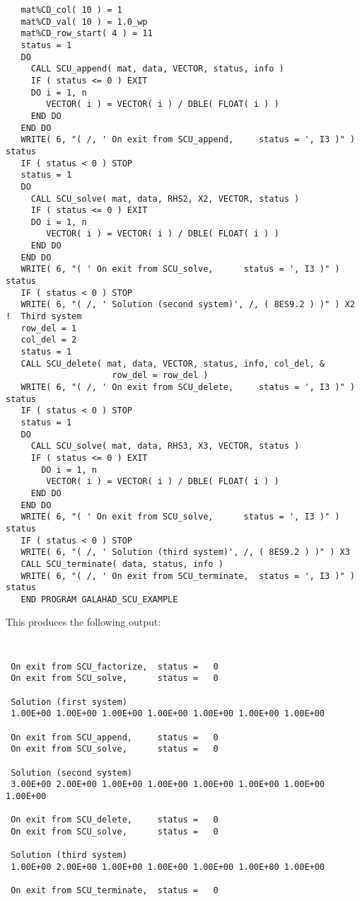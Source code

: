 \documentclass{galahad}
\begin{document}
{\begin{verbatim}
   mat%CD_col( 10 ) = 1 
   mat%CD_val( 10 ) = 1.0_wp 
   mat%CD_row_start( 4 ) = 11 
   status = 1 
   DO 
     CALL SCU_append( mat, data, VECTOR, status, info ) 
     IF ( status <= 0 ) EXIT 
     DO i = 1, n 
        VECTOR( i ) = VECTOR( i ) / DBLE( FLOAT( i ) ) 
     END DO 
   END DO 
   WRITE( 6, "( /, ' On exit from SCU_append,     status = ', I3 )" ) status 
   IF ( status < 0 ) STOP 
   status = 1 
   DO 
     CALL SCU_solve( mat, data, RHS2, X2, VECTOR, status ) 
     IF ( status <= 0 ) EXIT 
     DO i = 1, n 
        VECTOR( i ) = VECTOR( i ) / DBLE( FLOAT( i ) ) 
     END DO 
   END DO 
   WRITE( 6, "( ' On exit from SCU_solve,      status = ', I3 )" ) status 
   IF ( status < 0 ) STOP 
   WRITE( 6, "( /, ' Solution (second system)', /, ( 8ES9.2 ) )" ) X2 
!  Third system 
   row_del = 1 
   col_del = 2 
   status = 1 
   CALL SCU_delete( mat, data, VECTOR, status, info, col_del, & 
                     row_del = row_del ) 
   WRITE( 6, "( /, ' On exit from SCU_delete,     status = ', I3 )" ) status 
   IF ( status < 0 ) STOP 
   status = 1 
   DO 
     CALL SCU_solve( mat, data, RHS3, X3, VECTOR, status ) 
     IF ( status <= 0 ) EXIT 
       DO i = 1, n 
        VECTOR( i ) = VECTOR( i ) / DBLE( FLOAT( i ) ) 
     END DO 
   END DO 
   WRITE( 6, "( ' On exit from SCU_solve,      status = ', I3 )" ) status 
   IF ( status < 0 ) STOP 
   WRITE( 6, "( /, ' Solution (third system)', /, ( 8ES9.2 ) )" ) X3 
   CALL SCU_terminate( data, status, info ) 
   WRITE( 6, "( /, ' On exit from SCU_terminate,  status = ', I3 )" ) status 
   END PROGRAM GALAHAD_SCU_EXAMPLE 
\end{verbatim}
}
This produces the following output:
{\tt
\begin{verbatim}
 On exit from SCU_factorize,  status =   0
 On exit from SCU_solve,      status =   0

 Solution (first system)
 1.00E+00 1.00E+00 1.00E+00 1.00E+00 1.00E+00 1.00E+00 1.00E+00

 On exit from SCU_append,     status =   0
 On exit from SCU_solve,      status =   0

 Solution (second system)
 3.00E+00 2.00E+00 1.00E+00 1.00E+00 1.00E+00 1.00E+00 1.00E+00 1.00E+00

 On exit from SCU_delete,     status =   0
 On exit from SCU_solve,      status =   0

 Solution (third system)
 1.00E+00 2.00E+00 1.00E+00 1.00E+00 1.00E+00 1.00E+00 1.00E+00

 On exit from SCU_terminate,  status =   0
\end{verbatim}
}
\end{document}
